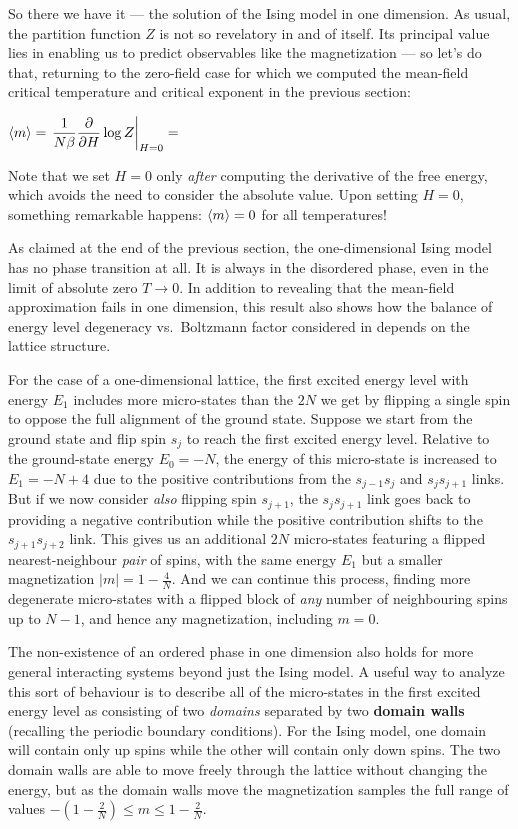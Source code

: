 So there we have it --- the solution of the Ising model in one dimension.
As usual, the partition function $Z$ is not so revelatory in and of itself.
Its principal value lies in enabling us to predict observables like the magnetization --- so let's do that, returning to the zero-field case for which we computed the mean-field critical temperature and critical exponent in the previous section:
\begin{mdframed}
  $\displaystyle \left\langle m \right\rangle = \left. \frac{1}{N\beta} \frac{\partial }{\partial H}\log Z \right|_{H = 0} = $ \\[80 pt]
\end{mdframed}
Note that we set $H = 0$ only \textit{after} computing the derivative of the free energy, which avoids the need to consider the absolute value.
Upon setting $H = 0$, something remarkable happens: $\left\langle m \right\rangle = 0$ for all temperatures!

As claimed at the end of the previous section, the one-dimensional Ising model has no phase transition at all.
It is always in the disordered phase, even in the limit of absolute zero $T \to 0$.
In addition to revealing that the mean-field approximation fails in one dimension, this result also shows how the balance of energy level degeneracy vs.\ Boltzmann factor considered in  depends on the lattice structure.

For the case of a one-dimensional lattice, the first excited energy level with energy $E_1$ includes more micro-states than the $2N$ we get by flipping a single spin to oppose the full alignment of the ground state.
Suppose we start from the ground state and flip spin $s_j$ to reach the first excited energy level.
Relative to the ground-state energy $E_0 = -N$, the energy of this micro-state is increased to $E_1 = -N + 4$ due to the positive contributions from the $s_{j - 1} s_j$ and $s_j s_{j + 1}$ links.
But if we now consider \textit{also} flipping spin $s_{j + 1}$, the $s_j s_{j + 1}$ link goes back to providing a negative contribution while the positive contribution shifts to the $s_{j + 1} s_{j + 2}$ link.
This gives us an additional $2N$ micro-states featuring a flipped nearest-neighbour \textit{pair} of spins, with the same energy $E_1$ but a smaller magnetization $|m| = 1 - \frac{4}{N}$.
And we can continue this process, finding more degenerate micro-states with a flipped block of \textit{any} number of neighbouring spins up to $N - 1$, and hence any magnetization, including $m = 0$.

The non-existence of an ordered phase in one dimension also holds for more general interacting systems beyond just the Ising model.
A useful way to analyze this sort of behaviour is to describe all of the micro-states in the first excited energy level as consisting of two \textit{domains} separated by two \textbf{domain walls} (recalling the periodic boundary conditions).
For the Ising model, one domain will contain only up spins while the other will contain only down spins.
The two domain walls are able to move freely through the lattice without changing the energy, but as the domain walls move the magnetization samples the full range of values $-\left(1 - \frac{2}{N}\right) \leq m \leq 1 - \frac{2}{N}$.

